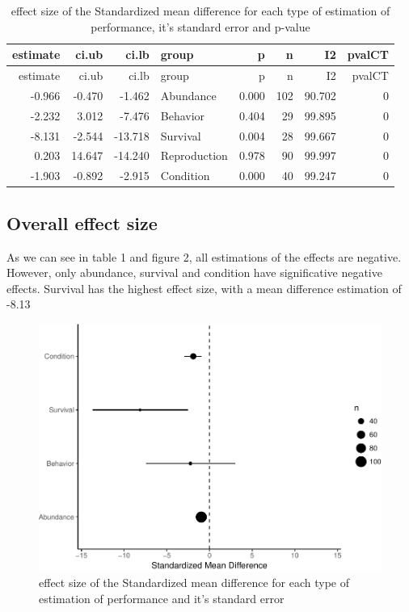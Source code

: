 \documentclass[]{elsarticle} %
\makeatletter
\def\maxwidth{\ifdim\Gin@nat@width>\linewidth\linewidth
\else\Gin@nat@width\fi}
\let\Oldincludegraphics\includegraphics
\renewcommand{\includegraphics}[1]{\Oldincludegraphics[width=\maxwidth]{#1}}
\makeatother
\begin{document}
\begin{longtable}[c]{@{}rrrlrrrr@{}}
\caption{effect size of the Standardized mean difference for each type
of estimation of performance, it's standard error and
p-value}\tabularnewline
\toprule
estimate & ci.ub & ci.lb & group & p & n & I2 & pvalCT\tabularnewline
\midrule
\endfirsthead
\toprule
estimate & ci.ub & ci.lb & group & p & n & I2 & pvalCT\tabularnewline
\midrule
\endhead
-0.966 & -0.470 & -1.462 & Abundance & 0.000 & 102 & 90.702 &
0\tabularnewline
-2.232 & 3.012 & -7.476 & Behavior & 0.404 & 29 & 99.895 &
0\tabularnewline
-8.131 & -2.544 & -13.718 & Survival & 0.004 & 28 & 99.667 &
0\tabularnewline
0.203 & 14.647 & -14.240 & Reproduction & 0.978 & 90 & 99.997 &
0\tabularnewline
-1.903 & -0.892 & -2.915 & Condition & 0.000 & 40 & 99.247 &
0\tabularnewline
\bottomrule
\end{longtable}

\subsection{Overall effect size}\label{overall-effect-size}

As we can see in table 1 and figure 2, all estimations of the effects
are negative. However, only abundance, survival and condition have
significative negative effects. Survival has the highest effect size,
with a mean difference estimation of -8.13

\begin{figure}[htbp]
\centering
\includegraphics{MetanalysisNeonics2_files/figure-latex/unnamed-chunk-4-1.pdf}
\caption{effect size of the Standardized mean difference for each type
of estimation of performance and it's standard error}
\end{figure}
\end{document}
